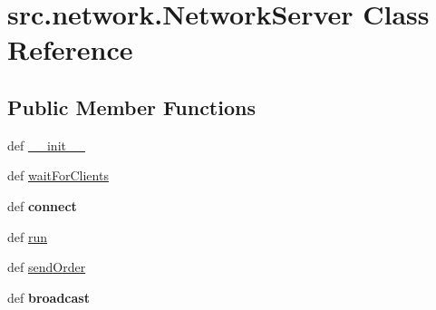 \hypertarget{classsrc_1_1network_1_1_network_server}{\section{src.\-network.\-Network\-Server \-Class \-Reference}
\label{classsrc_1_1network_1_1_network_server}
}
\subsection*{\-Public \-Member \-Functions}
\begin{DoxyCompactItemize}
\item 
def \hyperlink{classsrc_1_1network_1_1_network_server_a039e381f87c229e9158c452edb57b8a3}{\-\_\-\-\_\-init\-\_\-\-\_\-}
\item 
def \hyperlink{classsrc_1_1network_1_1_network_server_af334f8d7eed6eca8a8ba7088945634a9}{wait\-For\-Clients}
\item 
\hypertarget{classsrc_1_1network_1_1_network_server_a5acb32500e0abbdf47878f705532a67e}{def {\bfseries connect}}\label{classsrc_1_1network_1_1_network_server_a5acb32500e0abbdf47878f705532a67e}

\item 
def \hyperlink{classsrc_1_1network_1_1_network_server_ad0dba462246e4f49d69ce4b5395389e1}{run}
\item 
def \hyperlink{classsrc_1_1network_1_1_network_server_afdb13f3f3e49a452518553d7c980772f}{send\-Order}
\item 
\hypertarget{classsrc_1_1network_1_1_network_server_a03dc0456c8bf224b47531f171dbecf69}{def {\bfseries broadcast}}\label{classsrc_1_1network_1_1_network_server_a03dc0456c8bf224b47531f171dbecf69}

\end{DoxyCompactItemize}
